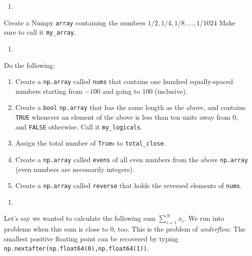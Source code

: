 \documentclass[
  12pt,
  krantz2]{krantz}
\providecommand{\tightlist}{%
  \setlength{\itemsep}{0pt}\setlength{\parskip}{0pt}}
\begin{document}
\begin{enumerate}
\def\labelenumi{\arabic{enumi}.}
\setcounter{enumi}{1}
\tightlist
\item
\end{enumerate}

Create a Numpy \texttt{array} containing the numbers \(1/2, 1/4, 1/8, \ldots, 1/1024\) Make sure to call it \texttt{my\_array}.

\begin{enumerate}
\def\labelenumi{\arabic{enumi}.}
\setcounter{enumi}{2}
\tightlist
\item
\end{enumerate}

Do the following:

\begin{enumerate}
\def\labelenumi{\alph{enumi})}
\tightlist
\item
  Create a \texttt{np.array} called \texttt{nums} that contains one hundred equally-spaced numbers starting from \(-100\) and going to \(100\) (inclusive).
\item
  Create a \texttt{bool} \texttt{np.array} that has the same length as the above, and contains \texttt{TRUE} whenever an element of the above is less than ten units away from \(0\), and \texttt{FALSE} otherwise. Call it \texttt{my\_logicals}.
\item
  Assign the total number of \texttt{True}s to \texttt{total\_close}.
\item
  Create a \texttt{np.array} called \texttt{evens} of all even numbers from the above \texttt{np.array} (even numbers are necessarily integers).
\item
  Create a \texttt{np.array} called \texttt{reverse} that holds the reversed elements of \texttt{nums}.
\end{enumerate}

\begin{enumerate}
\def\labelenumi{\arabic{enumi}.}
\setcounter{enumi}{3}
\tightlist
\item
\end{enumerate}

Let's say we wanted to calculate the following sum \(\sum_{i=1}^N x_i\). We run into problems when this sum is close to \(0\), too. This is the problem of \emph{underflow}. The smallest positive floating point can be recovered by typing \texttt{np.nextafter(np.float64(0),np.float64(1))}.
\end{document}
